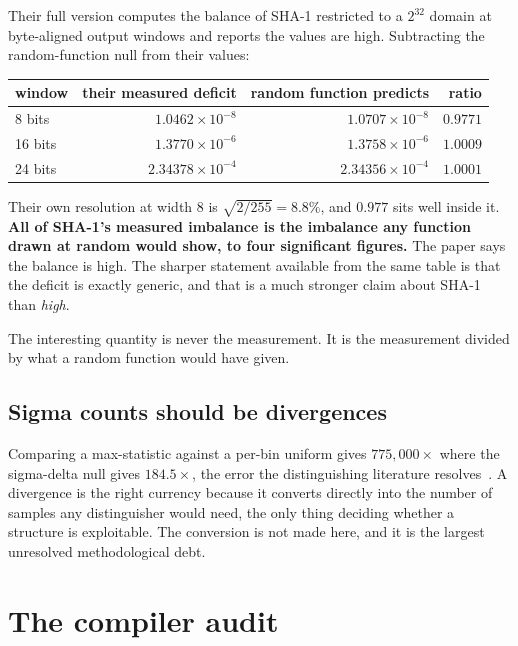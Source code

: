 Their full version computes the balance of SHA-1 restricted to a \(2^{32}\) domain at byte-aligned output windows and reports the values are high. Subtracting the random-function null from their values:

\begin{center}
\begin{tabular}{@{}lrrr@{}}
\toprule
window & their measured deficit & random function predicts & ratio \\
\midrule
8 bits & \(1.0462 \times 10^{-8}\) & \(1.0707 \times 10^{-8}\) & \(0.9771\) \\
16 bits & \(1.3770 \times 10^{-6}\) & \(1.3758 \times 10^{-6}\) & \(1.0009\) \\
24 bits & \(2.34378 \times 10^{-4}\) & \(2.34356 \times 10^{-4}\) & \(1.0001\) \\
\bottomrule
\end{tabular}
\end{center}

Their own resolution at width 8 is \(\sqrt{2/255} = 8.8\%\), and \(0.977\) sits well inside it. \textbf{All of SHA-1's measured imbalance is the imbalance any function drawn at random would show, to four significant figures.} The paper says the balance is high. The sharper statement available from the same table is that the deficit is exactly generic, and that is a much stronger claim about SHA-1 than \emph{high}.

The interesting quantity is never the measurement. It is the measurement divided by what a random function would have given.

\subsection{Sigma counts should be divergences}

Comparing a max-statistic against a per-bin uniform gives \(775{,}000\times\) where the sigma-delta null gives \(184.5\times\), the error the distinguishing literature resolves~\cite{src:Baigneres-Junod-and-Vaudenay-2004}. A divergence is the right currency because it converts directly into the number of samples any distinguisher would need, the only thing deciding whether a structure is exploitable. The conversion is not made here, and it is the largest unresolved methodological debt.

\section{The compiler audit}

